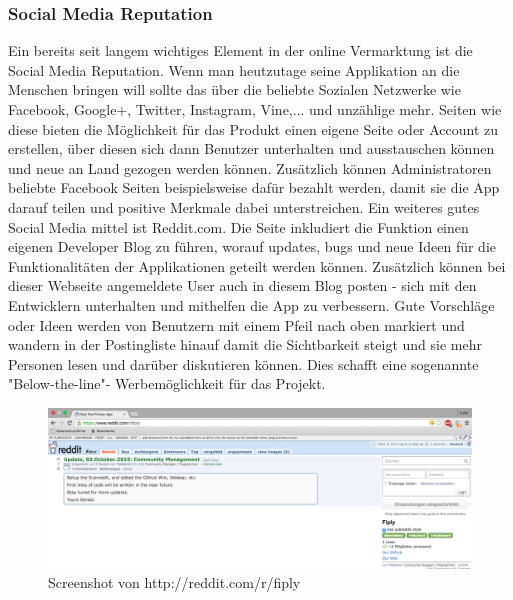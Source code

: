 \documentclass[FIPLY_base.tex]{subfiles}
\begin{document}
\subsubsection{Social Media Reputation}
Ein bereits seit langem wichtiges Element in der online Vermarktung ist die Social Media Reputation. Wenn man heutzutage seine Applikation an die Menschen bringen will sollte das über die beliebte Sozialen Netzwerke wie Facebook, Google+, Twitter, Instagram, Vine,... und unzählige mehr. Seiten wie diese bieten die Möglichkeit für das Produkt einen eigene Seite oder Account zu erstellen, über diesen sich dann Benutzer unterhalten und ausstauschen können und neue an Land gezogen werden können. Zusätzlich können Administratoren beliebte Facebook Seiten beispielsweise dafür bezahlt werden, damit sie die App darauf teilen und positive Merkmale dabei unterstreichen. 
\newline
Ein weiteres gutes Social Media mittel ist Reddit.com. Die Seite inkludiert die Funktion einen eigenen Developer Blog zu führen, worauf updates, bugs und neue Ideen für die Funktionalitäten der Applikationen geteilt werden können. Zusätzlich können bei dieser Webseite angemeldete User auch in diesem Blog posten - sich mit den Entwicklern unterhalten und mithelfen die App zu verbessern. Gute Vorschläge oder Ideen werden von Benutzern mit einem Pfeil nach oben markiert und wandern in der Postingliste hinauf damit die Sichtbarkeit steigt und sie mehr Personen lesen und darüber diskutieren können. Dies schafft eine sogenannte "Below-the-line"- Werbemöglichkeit für das Projekt.

\begin{figure}[h]
	\centering
	\includegraphics[scale=0.28]{img/fiplysubredditscreenshot}
	\caption{Screenshot von http://reddit.com/r/fiply}
\end{figure}
\end{document}
